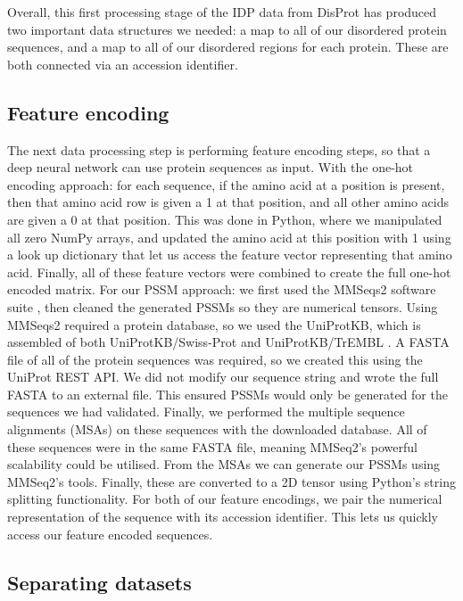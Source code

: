 \documentclass{l4proj}
\begin{document}
Overall, this first processing stage of the IDP data from DisProt has produced two important data structures we needed: a map to all of our disordered protein sequences, and a map to all of our disordered regions for each protein. These are both connected via an accession identifier.





\subsection{Feature encoding}
\label{chap:implementation sec:features}

The next data processing step is performing feature encoding steps, so that a deep neural network can use protein sequences as input. With the one-hot encoding approach: for each sequence, if the amino acid at a position is present, then that amino acid row is given a 1 at that position, and all other amino acids are given a 0 at that position. This was done in Python, where we manipulated all zero NumPy arrays, and updated the amino acid at this position with 1 using a look up dictionary that let us access the feature vector representing that amino acid. Finally, all of these feature vectors were combined to create the full one-hot encoded matrix. For our PSSM approach: we first used the MMSeqs2 software suite \citep{Steinegger:17}, then cleaned the generated PSSMs so they are numerical tensors. Using MMSeqs2 required a protein database, so we used the UniProtKB, which is assembled of both UniProtKB/Swiss-Prot and UniProtKB/TrEMBL \citep{uniprot:22}. A FASTA file of all of the protein sequences was required, so we created this using the UniProt REST API. We did not modify our sequence string and wrote the full FASTA to an external file. This ensured PSSMs would only be generated for the sequences we had validated. Finally, we performed the multiple sequence alignments (MSAs) on these sequences with the downloaded database. All of these sequences were in the same FASTA file, meaning MMSeq2’s powerful scalability could be utilised. From the MSAs we can generate our PSSMs using MMSeq2’s tools. Finally, these are converted to a 2D tensor using Python’s string splitting functionality. For both of our feature encodings, we pair the numerical representation of the sequence with its accession identifier. This lets us quickly access our feature encoded sequences.

\subsection{Separating datasets}
\end{document}
